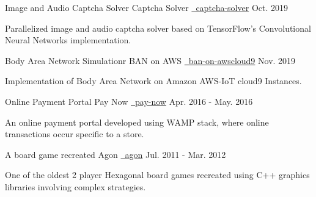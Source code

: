 \begin{cventries}
   \cventry
    {Image and Audio Captcha Solver}
    {Captcha Solver}
    {\href{https://github.com/mukeshmk/image-audio-captcha}{\faGithubSquare\ captcha-solver}}
    {Oct. 2019}
    {
      \begin{cvitems}
        \item {Parallelized image and audio captcha solver based on TensorFlow’s Convolutional Neural Networks implementation.}
      \end{cvitems}
    }
  \cventry
    {Body Area Network Simulationr}
    {BAN on AWS}
    {\href{https://github.com/mukeshmk/ban-on-awscloud9}{\faGithubSquare\ ban-on-awscloud9}}
    {Nov. 2019}
    {
      \begin{cvitems}
        \item {Implementation of Body Area Network on Amazon AWS-IoT cloud9 Instances.}
      \end{cvitems}
    }
  \cventry
    {Online Payment Portal}
    {Pay Now}
    {\href{https://github.com/mukeshmk/pay-now}{\faGithubSquare\ pay-now}}
    {Apr. 2016 - May. 2016}
    {
      \begin{cvitems}
        \item {An online payment portal developed using WAMP stack, where online transactions occur specific to a store.}
      \end{cvitems}
    }
  \cventry
    {A board game recreated}
    {Agon}
    {\href{https://github.com/mukeshmk/agon}{\faGithubSquare\ agon}}
    {Jul. 2011 - Mar. 2012}
    {
      \begin{cvitems}
        \item {One of the oldest 2 player Hexagonal board games recreated using C++ graphics libraries involving complex strategies.}
      \end{cvitems}
    }
\end{cventries}
